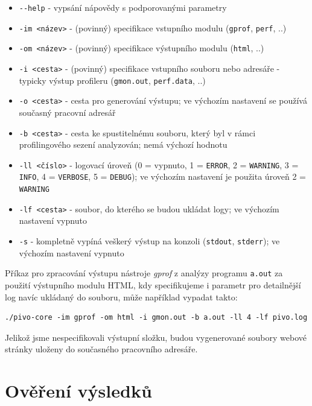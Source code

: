 \documentclass[czech,BP]{thesiskiv}
\begin{document}
\begin{itemize}
\item \texttt{-{}-help} - vypsání nápovědy s podporovanými parametry
\item \texttt{-im <název>} - (povinný) specifikace vstupního modulu (\texttt{gprof}, \texttt{perf}, ..)
\item \texttt{-om <název>} - (povinný) specifikace výstupního modulu (\texttt{html}, ..)
\item \texttt{-i <cesta>} - (povinný) specifikace vstupního souboru nebo adresáře - typicky výstup profileru (\texttt{gmon.out}, \texttt{perf.data}, ..)
\item \texttt{-o <cesta>} - cesta pro generování výstupu; ve výchozím nastavení se používá současný pracovní adresář
\item \texttt{-b <cesta>} - cesta ke spustitelnému souboru, který byl v rámci profilingového sezení analyzován; nemá výchozí hodnotu
\item \texttt{-ll <číslo>} - logovací úroveň (0 = vypnuto, 1 = \texttt{ERROR}, 2 = \texttt{WARNING}, 3 = \texttt{INFO}, 4 = \texttt{VERBOSE}, 5 = \texttt{DEBUG}); ve výchozím nastavení je použita úroveň 2 = \texttt{WARNING}
\item \texttt{-lf <cesta>} - soubor, do kterého se budou ukládat logy; ve výchozím nastavení vypnuto
\item \texttt{-s} - kompletně vypíná veškerý výstup na konzoli (\texttt{stdout}, \texttt{stderr}); ve výchozím nastavení vypnuto
\end{itemize}

Příkaz pro zpracování výstupu nástroje \emph{gprof} z analýzy programu \texttt{a.out} za použití výstupního modulu HTML, kdy specifikujeme i parametr pro detailnější log navíc ukládaný do souboru, může například vypadat takto:

\lstset{escapechar=@,style=custombash}
\begin{lstlisting}
./pivo-core -im gprof -om html -i gmon.out -b a.out -ll 4 -lf pivo.log
\end{lstlisting}

Jelikož jsme nespecifikovali výstupní složku, budou vygenerované soubory webové stránky uloženy do současného pracovního adresáře.



\chapter{Ověření výsledků}
\end{document}
